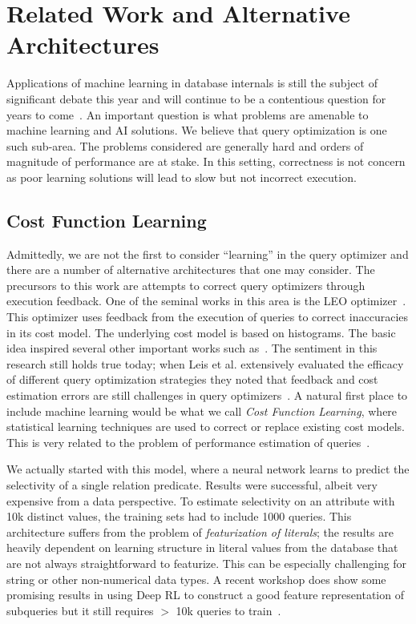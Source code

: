 \section{Related Work and Alternative Architectures}
Applications of machine learning in database internals is still the subject of significant debate this year and will continue to be a contentious question for years to come~\cite{btree, kraska2018case, mitzenmacher2018model, ma2018query}. An important question is what problems are amenable to machine learning and AI solutions. We believe that query optimization is one such sub-area. The problems considered are generally hard and orders of magnitude of performance are at stake. In this setting, correctness is not concern as poor learning solutions will lead to slow but not incorrect execution.

\subsection{Cost Function Learning} 
Admittedly, we are not the first to consider ``learning'' in the query optimizer and there are a number of alternative architectures that one may consider. The precursors to this work are attempts to correct query optimizers through execution feedback.
One of the seminal works in this area is the LEO optimizer~\cite{markl2003leo}. This optimizer uses feedback from the execution of queries to correct inaccuracies in its cost model. The underlying cost model is based on histograms. The basic idea inspired several other important works such as~\cite{chaudhuri2008pay}. The sentiment in this research still holds true today; when Leis et al. extensively evaluated the efficacy of different query optimization strategies they noted that feedback and cost estimation errors are still challenges in query optimizers~\cite{leis2015good}. A natural first place to include machine learning would be what we call \emph{Cost Function Learning}, where statistical learning techniques are used to correct or replace existing cost models. This is very related to the problem of performance estimation of queries~\cite{akdere2012learning, wu2013predicting, wu2013towards}. 

We actually started with this model, where a neural network learns to predict the selectivity of a single relation predicate. Results were successful, albeit very expensive from a data perspective. To estimate selectivity on an attribute with 10k distinct values, the training sets had to include 1000 queries. This architecture suffers from the problem of \emph{featurization of literals}; the results are heavily dependent on learning structure in literal values from the database that are not always straightforward to featurize. This can be especially challenging for string or other non-numerical data types.  A recent workshop does show some promising results in using Deep RL to construct a good feature representation of subqueries but it still requires $>$ 10k queries to train~\cite{ortiz2018learning}. 

